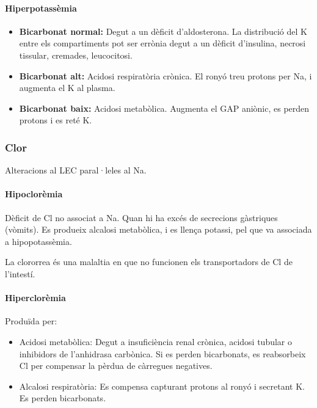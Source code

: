 \paragraph{Hiperpotassèmia}

\begin{itemize}
\item \textbf{Bicarbonat normal:} Degut a un dèficit d'aldosterona. La
  distribució del K entre els compartiments pot ser errònia degut a un
  dèficit d'insulina, necrosi tissular, cremades, leucocitosi.

\item \textbf{Bicarbonat alt:} Acidosi respiratòria crònica. El ronyó
  treu protons per Na, i augmenta el K al plasma.

\item \textbf{Bicarbonat baix:} Acidosi metabòlica. Augmenta el GAP
  aniònic, es perden protons i es reté K.
\end{itemize}

\subsubsection{Clor}
\label{sec:clor}

Alteracions al LEC paral·leles al Na.

\paragraph{Hipoclorèmia}
Dèficit de Cl no associat a Na. Quan hi ha excés de secrecions
gàstriques (vòmits). Es produeix alcalosi metabòlica, i es llença
potassi, pel que va associada a hipopotassèmia.

La clororrea és una malaltia en que no funcionen els transportadors de
Cl de l'intestí.

\paragraph{Hiperclorèmia}
Produïda per:
\begin{itemize}
\item Acidosi metabòlica: Degut a insuficiència renal crònica, acidosi
  tubular o inhibidors de l'anhidrasa carbònica. Si es perden
  bicarbonats, es reabsorbeix Cl per compensar la pèrdua de càrregues
  negatives.

\item Alcalosi respiratòria: Es compensa capturant protons al ronyó i
  secretant K. Es perden bicarbonats.
\end{itemize}